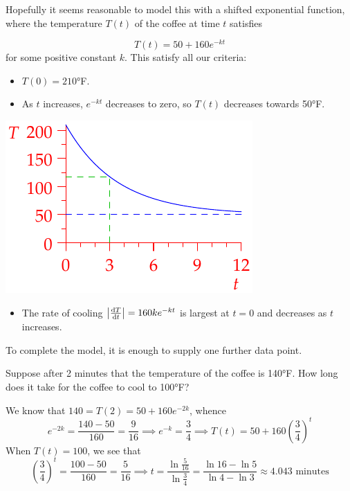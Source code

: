 Hopefully it seems reasonable to model this with a shifted exponential function, where  the temperature $T(t)$ of the coffee at time $t$ satisfies\par
\begin{minipage}[t]{0.6\linewidth}\vspace{-8pt}
	\[
		T(t)=50+160e^{-kt}
	\]
	for some positive constant $k$. This satisfy all our criteria:
	\begin{itemize}
	  \item $T(0)=\ang{210}$F.
	  \item As $t$ increases, $e^{-kt}$ decreases to zero, so $T(t)$ decreases towards \ang{50}F.
	\end{itemize}
\end{minipage}
\hfill
\begin{minipage}[t]{0.39\linewidth}\vspace{-15pt}
	\hfill\includegraphics{coffee}
\end{minipage}\par
\begin{itemize}
  \item The rate of cooling $\smash[t]{\nm{\diff[T]{t}}}=160ke^{-kt}$ is largest at $t=0$ and decreases as $t$ increases. 
\end{itemize}

To complete the model, it is enough to supply one further data point.\par

Suppose after 2 minutes that the temperature of the coffee is \ang{140}F. How long does it take for the coffee to cool to \ang{100}F?\smallbreak

We know that $140=T(2)=50+160e^{-2k}$, whence
\[
	e^{-2k}=\frac{140-50}{160}=\frac 9{16}\implies e^{-k}=\frac 34\implies T(t)=50+160\left(\frac 34\right)^t
\]
When $T(t)=100$, we see that
\[
	\left(\frac 34\right)^t=\frac{100-50}{160}=\frac 5{16}\implies t=\frac{\ln\frac 5{16}}{\ln\frac 34} =\frac{\ln 16-\ln 5}{\ln 4-\ln 3}\approx 4.043\text{ minutes}
\]


